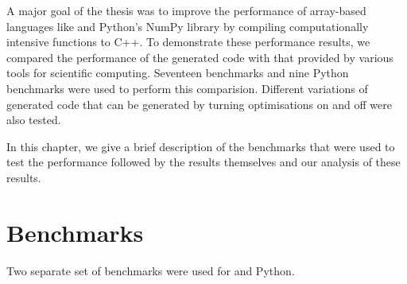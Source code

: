 A major goal of the thesis was to improve the performance of array-based languages like \matlab and Python's NumPy library by compiling computationally intensive functions to C++. To demonstrate these performance results, we compared the performance of the generated code with that provided by various tools for scientific computing. Seventeen \matlab benchmarks and nine Python benchmarks were used to perform this comparision. Different variations of generated code that can be generated by turning optimisations on and off were also tested. 

In this chapter, we give a brief description of the benchmarks that were used to test the performance followed by the results themselves and our analysis of these results. 
\section{Benchmarks}
Two separate set of benchmarks  were used for \matlab and Python. 
